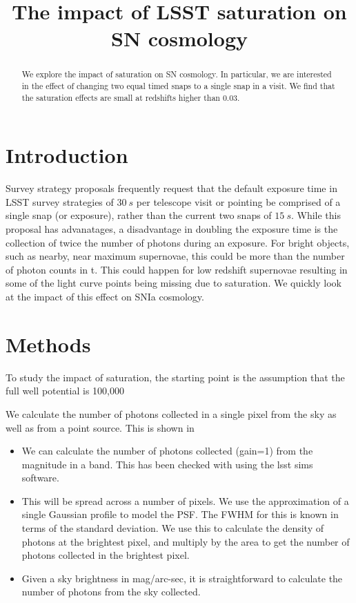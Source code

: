 \documentclass[\docopts]{\docclass}
\begin{document}
\title{The impact of LSST saturation on SN cosmology}

\maketitlepre

\begin{abstract}
We explore the impact of saturation on SN cosmology. In particular, we are interested in the effect of changing two equal timed snaps to a single snap in a visit. We find that the saturation effects are small at redshifts higher than 0.03.
\end{abstract}


\maketitlepost

\section{Introduction}
\label{sec:intro}
Survey strategy proposals frequently request that the default exposure time in LSST survey strategies
of $30~s$ per telescope visit or pointing be comprised of a single snap (or exposure), rather than the current two snaps of $15~s.$ While this proposal has advanatages, a disadvantage in doubling the exposure time is the collection of twice the number of photons during an exposure. For bright objects, such as nearby, near maximum supernovae, this could be more than the number of photon counts in t. This could happen for low redshift supernovae resulting in some of the light curve points being missing due to saturation. We quickly look at the impact of this effect on SNIa cosmology.  

\section{Methods}
\label{sec:methods}
To study the impact of saturation, the starting point is the assumption that the full well potential is 100,000

We calculate the number of photons collected in a single pixel from the sky as well as from a point source. This is shown in 
\begin{itemize}
        \item We can calculate the number of photons collected (gain=1) from the magnitude in a band. This has been checked with using the lsst sims software. 
        \item This will be spread across a number of pixels. We use the approximation of a single Gaussian profile to model the PSF. The FWHM for this is known in terms of the standard deviation. We use this to calculate the density of photons at the brightest pixel, and multiply by the area to get the number of photons collected in the brightest pixel. 
        \item Given a sky brightness in mag/arc-sec, it is straightforward to calculate the number of photons from the sky collected. 
    \end{itemize}
\end{document}
